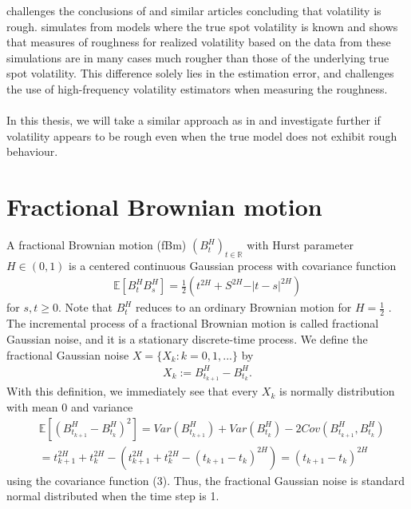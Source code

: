 \documentclass{article}
\begin{document}
\cite{cont} challenges the conclusions of \cite{gatheral} and similar articles concluding that volatility is rough. \cite{cont} simulates from models where the true spot volatility is known and shows that measures of roughness for realized volatility based on the data from these simulations are in many cases much rougher than those of the underlying true spot volatility. This difference solely lies in the estimation error, and challenges the use of high-frequency volatility estimators when measuring the roughness.\\\\
In this thesis, we will take a similar approach as in \cite{cont} and investigate further if volatility appears to be rough even when the true model does not exhibit rough behaviour. 
\section{Fractional Brownian motion}
A fractional Brownian motion (fBm) $(B_t^H)_{t\in\mathbb{R}}$ with Hurst parameter $H\in(0,1)$ is a centered continuous Gaussian process with covariance function
\begin{align}
\mathbb{E}\left[B_t^HB_s^H\right] = \frac{1}{2}\left(t^{2H}+S^{2H}-\vert t-s\vert ^{2H} \right)
\end{align}
for $s,t\geq 0$. Note that $B_t^H$ reduces to an ordinary Brownian motion for $H = \frac{1}{2}$ \cite{dieker}. The incremental process of a fractional Brownian motion is called fractional Gaussian noise, and it is a stationary discrete-time process. We define the fractional Gaussian noise $X=\{X_k: k=0,1,...\}$ by 
\begin{align}
X_k:= B^H_{t_{k+1}}-B^H_{t_k}.
\end{align}
With this definition, we immediately see that every $X_k$ is normally distribution with mean 0 and variance 
\begin{align*}
&\mathbb{E}\left[ (B^H_{t_{k+1}}-B^H_{t_k})^2 \right] = Var (B^H_{t_{k+1}}) + Var(B^H_{t_k}) - 2Cov(B^H_{t_{k+1}}, B^H_{t_k})\\
&= t_{k+1}^{2H}+t_k^{2H} - \left( t_{k+1}^{2H}+t_k^{2H} - (t_{k+1}-t_k)^{2H} \right) = (t_{k+1}-t_k)^{2H}
\end{align*}
 using the covariance function (3). Thus, the fractional Gaussian noise is standard normal distributed when the time step is 1. 
\end{document}
